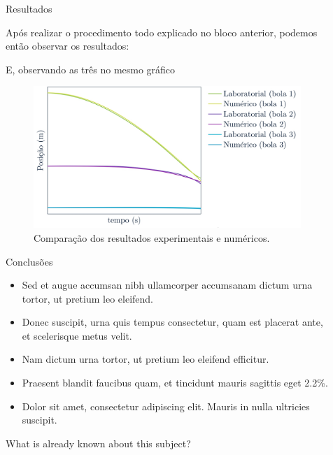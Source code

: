\documentclass[final]{beamer}
\newlength{\sepwidth}
\newlength{\colwidth}
\newcommand{\separatorcolumn}{\begin{column}{\sepwidth}\end{column}}
\begin{document}
\begin{frame}[t]
\begin{columns}[t]
\begin{column}{\colwidth}


\end{column}

\separatorcolumn

\begin{column}{\colwidth}


\begin{block}{Resultados}
    
    Após realizar o procedimento todo explicado no bloco anterior, podemos então observar os resultados:
    
    E, observando as três no mesmo gráfico
   \begin{figure}
   \includegraphics[width=.5\columnwidth]{images/4v2.jpg}
   \caption{Comparação dos resultados experimentais e numéricos.}
   \end{figure}
\end{block}

   \begin{block}{Conclusões}
    \begin{itemize}
      \item Sed et augue accumsan nibh ullamcorper accumsanam dictum urna tortor, ut pretium leo eleifend.  
      \item Donec suscipit, urna quis tempus consectetur, quam est placerat ante, et scelerisque metus velit. 
      \item Nam dictum urna tortor, ut pretium leo eleifend efficitur.
      \item Praesent blandit faucibus quam, et tincidunt mauris sagittis eget 2.2\%.
      \item Dolor sit amet, consectetur adipiscing elit. Mauris in nulla ultricies suscipit.
    \end{itemize}
  \end{block}


  \begin{exampleblock}{What is already known about this subject?}


\end{exampleblock}
\end{column}
\end{columns}
\end{frame}
\end{document}
